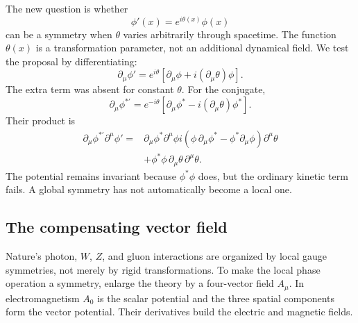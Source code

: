 The new question is whether
\begin{equation}
  \phi'(x)=e^{i\theta(x)}\phi(x)
  \label{eq:l07-local-u1}
\end{equation}
can be a symmetry when \(\theta\) varies arbitrarily through spacetime.
The function \(\theta(x)\) is a transformation parameter, not an additional
dynamical field. We test the proposal by differentiating:
\begin{equation}
  \partial_\mu\phi'
  =e^{i\theta}
   \left[\partial_\mu\phi+i(\partial_\mu\theta)\phi\right].
  \label{eq:l07-local-derivative}
\end{equation}
The extra term was absent for constant \(\theta\). For the conjugate,
\begin{equation}
  \partial_\mu\phi^{*\prime}
  =e^{-i\theta}
   \left[\partial_\mu\phi^*-i(\partial_\mu\theta)\phi^*\right].
\end{equation}
Their product is
\begin{align}
  \partial_\mu\phi^{*\prime}\partial^\mu\phi'
  ={}&
  \partial_\mu\phi^*\partial^\mu\phi
  i\left(
      \phi\,\partial_\mu\phi^*
      -\phi^*\partial_\mu\phi
    \right)\partial^\mu\theta
  \nonumber\\
  &+\phi^*\phi\,
    \partial_\mu\theta\,\partial^\mu\theta.
  \label{eq:l07-local-failure}
\end{align}
The potential remains invariant because \(\phi^*\phi\) does, but the ordinary
kinetic term fails. A global symmetry has not automatically become a local
one.

\begin{classroomqa}
\end{classroomqa}

\subsection{The compensating vector field}

Nature's photon, \(W\), \(Z\), and gluon interactions are organized by local
gauge symmetries, not merely by rigid transformations. To make the local
phase operation a symmetry, enlarge the theory by a four-vector field
\(A_\mu\). In electromagnetism \(A_0\) is the scalar potential and the three
spatial components form the vector potential. Their derivatives build the
electric and magnetic fields.

